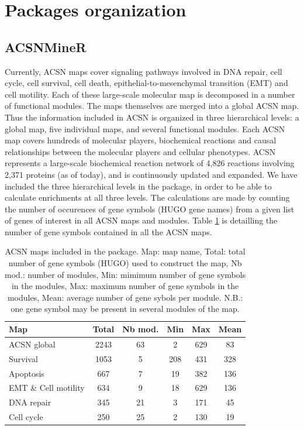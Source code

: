 \documentclass[article]{jss}
\begin{document}
\section[Packages organization]{Packages organization}

\subsection{ACSNMineR}
Currently, ACSN maps cover signaling pathways involved in DNA repair, cell
cycle, cell survival, cell death, epithelial-to-mesenchymal transition (EMT) and
cell motility. Each of these large-scale molecular map is decomposed in a number
of functional modules. The maps themselves are merged into a global ACSN map.
Thus the information included in ACSN is organized in three hierarchical levels:
a global map, five individual maps, and several functional modules. Each
ACSN map covers hundreds of molecular players, biochemical reactions and causal
relationships between the molecular players and cellular phenotypes.  ACSN
represents a large-scale biochemical reaction network of 4,826 reactions
involving 2,371 proteins (as of today), and is continuously updated and expanded.  We have
included the three hierarchical levels in the  package, in order
to be able to calculate enrichments at all three levels. The calculations are
made by counting the number of occurences of gene symbols (HUGO gene names) from
a given list of genes of interest in all ACSN maps and modules. Table
\ref{tab:table1} is detailling the number of gene symbols contained in all the ACSN
maps.


\begin{table}[h!]
 \centering
  \caption{ACSN maps included in the  package. Map: map name,
  Total: total number of gene symbols (HUGO) used to construct the map, Nb
  mod.: number of modules, Min: mimimum number of gene symbols in the modules,
  Max: maximum number of gene symbols in the modules, Mean: average number of
  gene sybols per module. N.B.: one gene symbol may be present in several
  modules of the map.} \label{tab:table1}
  \begin{tabular}{l|c|c|c|c|c}
    \hline
    Map & Total & Nb mod. & Min & Max & Mean\\
    \hline
  ACSN global & 2243 & 63 & 2 &629& 83\\
  Survival  &1053&5  &208 &431 &328\\
  Apoptosis & 667&7 & 19& 382& 136\\
  EMT \& Cell motility &634 &9  &18 &629 &136\\
  DNA repair &345&21  &3 &171  &45\\
  Cell cycle &250&25  &2 &130  &19\\
  \hline

  \end{tabular}

\end{table}
\end{document}

